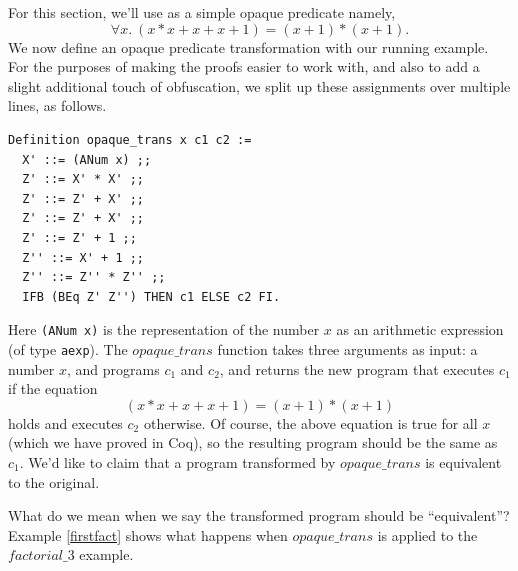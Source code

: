 \documentclass[compsoc,conference,a4paper,10pt,times]{IEEEtran}
\newtheorem{lemma}[theorem]{Lemma}
\begin{document}
For this section, we'll use as a simple opaque predicate namely,
    \[
    	\forall x.\ (x * x + x + x + 1) = (x + 1) * (x + 1).
    \]
We now define an opaque predicate transformation with our running example.  
    For the purposes of making the proofs easier to work with, and also to add a slight additional touch of obfuscation, we split up these assignments over multiple lines, as follows.
\begin{verbatim}
Definition opaque_trans x c1 c2 :=
  X' ::= (ANum x) ;;
  Z' ::= X' * X' ;;
  Z' ::= Z' + X' ;;
  Z' ::= Z' + X' ;;
  Z' ::= Z' + 1 ;;
  Z'' ::= X' + 1 ;;
  Z'' ::= Z'' * Z'' ;;
  IFB (BEq Z' Z'') THEN c1 ELSE c2 FI.
\end{verbatim}
Here \texttt{(ANum x)} is the representation of the number $x$ as an arithmetic expression (of type \texttt{aexp}).  The $opaque\_trans$ function takes three arguments as input: a number $x$, and programs $c_1$ and $c_2$, and returns the new program that executes $c_1$ if the equation
\[
	(x * x + x + x + 1) = (x + 1) * (x + 1)
\]
holds and executes $c_2$ otherwise.  Of course, the above equation is true for all $x$ (which we have proved in Coq), so the resulting program should be the same as $c_1$.  We'd like to claim that a program transformed by $opaque\_trans$ is equivalent to the original.

What do we mean when we say the transformed program should be ``equivalent''?  Example \ref{firstfact} shows what happens when $opaque\_trans$ is applied to the $factorial\_3$ example.  


\end{document}
